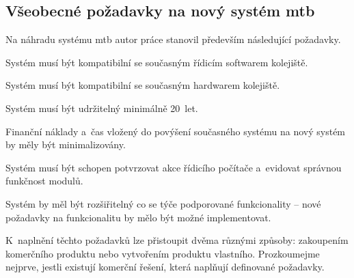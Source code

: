 \subsection{Všeobecné požadavky na nový systém \gls{mtb}} \label{subsec:gen_requirements}

Na náhradu systému \gls{mtb} autor práce stanovil především následující
požadavky.

\begin{compactenum}
\item Systém musí být kompatibilní se současným řídicím softwarem kolejiště.
\item Systém musí být kompatibilní se současným hardwarem kolejiště.
\item Systém musí být udržitelný minimálně 20~let.
\item Finanční náklady a~čas vložený do povýšení současného systému na nový
	systém by měly být minimalizovány.
\item Systém musí být schopen potvrzovat akce řídicího počítače a~evidovat správnou
	funkčnost modulů.
\item Systém by měl být rozšiřitelný co se týče podporované funkcionality –
	nové požadavky na funkcionalitu by mělo být možné implementovat.
\end{compactenum}

K~naplnění těchto požadavků lze přistoupit dvěma různými způsoby: zakoupením
komerčního produktu nebo vytvořením produktu vlastního. Prozkoumejme nejprve,
jestli existují komerční řešení, která naplňují definované požadavky.
